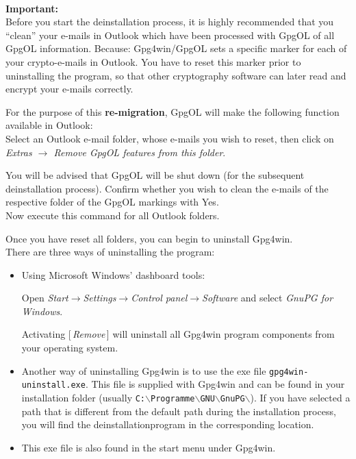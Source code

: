 \documentclass[a4paper,11pt,oneside,openright,titlepage]{scrbook}
\newcommand{\Button}[1]{[\,\textit{#1}\,]}
\newcommand{\Menu}[1]{\textit{#1}}
\newcommand{\Filename}[1]{\small{\texttt{#1}}\normalsize}
\newcommand{\Email}{e-mail}
\begin{document}
~\\
\textbf{Important:}\\
Before you start the deinstallation  process, it is highly recommended
that you ``clean'' your \Email{}s in Outlook which have been processed
with GpgOL of all GpgOL information. Because: Gpg4win/GpgOL sets a
specific marker for each of your crypto-\Email{}s in Outlook. You have
to reset this marker prior to uninstalling the program, so that other
cryptography software can later read and encrypt your \Email{}s
correctly.

For the purpose of this \textbf{re-migration}, GpgOL will make the following function available in Outlook:\\
Select an Outlook \Email{} folder, whose \Email{}s you wish to reset,
then click on \Menu{Extras $\rightarrow$ Remove GpgOL features from
this folder}.

You will be advised that GpgOL will be shut down (for the subsequent
deinstallation process). Confirm whether you wish to clean the
\Email{}s of the respective folder of the GpgOL markings with {Yes}.\\
Now execute this command for all Outlook folders.

Once you have reset all folders, you can begin to uninstall Gpg4win.\\


There are three ways of uninstalling the program:

\begin{itemize}
\item Using Microsoft Windows' dashboard tools:

    Open \Menu{Start$\rightarrow$Settings$\rightarrow$Control
    panel$\rightarrow$Software} and select \Menu{GnuPG for Windows}.

    Activating \Button{Remove} will uninstall all Gpg4win program
    components from your operating system.

\item Another way of uninstalling Gpg4win is to use the exe file
    \Filename{gpg4win-uninstall.exe}. This file is supplied with
    Gpg4win and can be found in your installation folder (usually
    \Filename{C:$\backslash$Programme$\backslash$GNU$\backslash$GnuPG$\backslash$}).
    If you have selected a path that is different from the default
    path during the installation process, you will find the
    deinstallationprogram in the corresponding location.

\item This exe file is also found in the start menu under Gpg4win.

\end{itemize}
\end{document}

